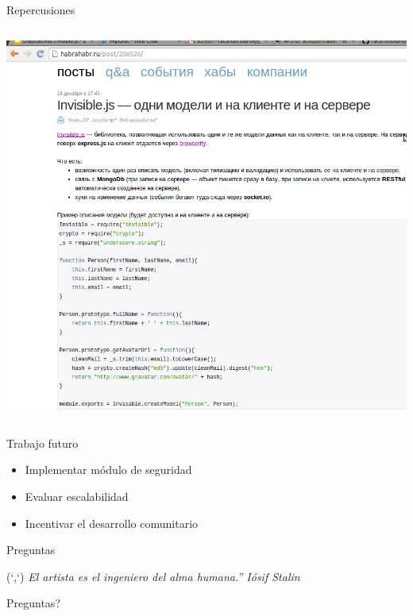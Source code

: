 \documentclass[xcolor=dvipsnames, 14pt]{beamer}
\newenvironment{reference}[2]{%
  \begin{textblock*}{\textwidth}(#1,#2)
      \footnotesize\it\bgroup\color{gray!50!black}}{\egroup\end{textblock*}}
\begin{document}
\begin{frame}{Repercusiones}
\begin{columns}[t]
\begin{column}{0.5\textwidth}
    \begin{center}
        \includegraphics[width=\textwidth]{img/rusia.png}
    \end{center}
\end{column}
\end{columns}


\end{frame}

\begin{frame}{Trabajo futuro}
\begin{itemize}
    \item Implementar módulo de seguridad
    \item Evaluar escalabilidad
    \item Incentivar el desarrollo comunitario
\end{itemize}

\end{frame}

\begin{frame}[c]{Preguntas}
\begin{reference}{4mm}{13mm}
``El artista es el ingeniero del alma humana.'' Iósif Stalin
\end{reference}
\Huge Preguntas?
\end{frame}

\end{document}

